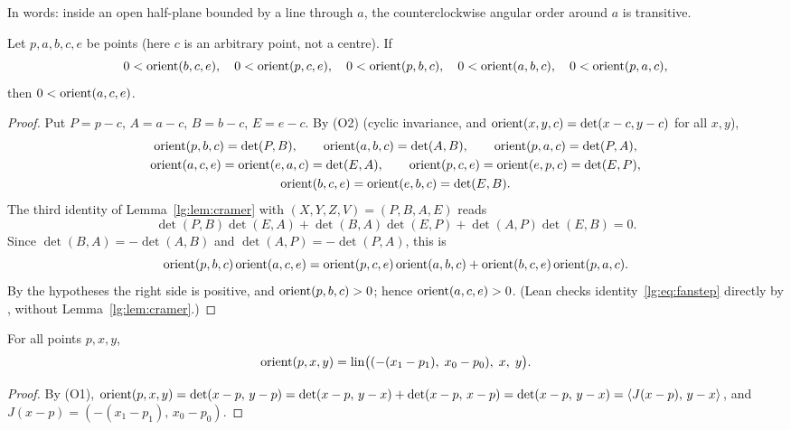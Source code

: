 In words: inside an open half-plane bounded by a line through $a$, the counterclockwise angular order around $a$ is
transitive.

\begin{lemma}\label{lg:lem:fan-step}
Let $p,a,b,c,e$ be points (here $c$ is an arbitrary point, not a centre). If
\[
  0<\operatorname{orient}(b,c,e),\quad 0<\operatorname{orient}(p,c,e),\quad 0<\operatorname{orient}(p,b,c),\quad 0<\operatorname{orient}(a,b,c),\quad 0<\operatorname{orient}(p,a,c),
\]
then $0<\operatorname{orient}(a,c,e)$.
\end{lemma}

\begin{proof}
Put $P=p-c$, $A=a-c$, $B=b-c$, $E=e-c$. By (O2) (cyclic invariance, and $\operatorname{orient}(x,y,c)=\det(x-c,y-c)$ for all
$x,y$),
\begin{gather*}
  \operatorname{orient}(p,b,c)=\det(P,B),\qquad \operatorname{orient}(a,b,c)=\det(A,B),\qquad \operatorname{orient}(p,a,c)=\det(P,A),\\
  \operatorname{orient}(a,c,e)=\operatorname{orient}(e,a,c)=\det(E,A),\qquad \operatorname{orient}(p,c,e)=\operatorname{orient}(e,p,c)=\det(E,P),\\
  \operatorname{orient}(b,c,e)=\operatorname{orient}(e,b,c)=\det(E,B).
\end{gather*}
The third identity of Lemma~\ref{lg:lem:cramer} with $(X,Y,Z,V)=(P,B,A,E)$ reads
\[
  \det(P,B)\det(E,A)+\det(B,A)\det(E,P)+\det(A,P)\det(E,B)=0.
\]
Since $\det(B,A)=-\det(A,B)$ and $\det(A,P)=-\det(P,A)$, this is
\begin{equation}\label{lg:eq:fanstep}
  \operatorname{orient}(p,b,c)\operatorname{orient}(a,c,e)=\operatorname{orient}(p,c,e)\operatorname{orient}(a,b,c)+\operatorname{orient}(b,c,e)\operatorname{orient}(p,a,c).
\end{equation}
By the hypotheses the right side is positive, and $\operatorname{orient}(p,b,c)>0$; hence $\operatorname{orient}(a,c,e)>0$. (Lean checks
identity~\eqref{lg:eq:fanstep} directly by , without Lemma~\ref{lg:lem:cramer}.)
\end{proof}

\begin{lemma}\label{lg:lem:orient-lin}
For all points $p,x,y$,
\[
  \operatorname{orient}(p,x,y)=\operatorname{lin}\bigl((-(x_1-p_1),\;x_0-p_0),\;x,\;y\bigr).
\]
\end{lemma}

\begin{proof}
By (O1), $\operatorname{orient}(p,x,y)=\det(x-p,\,y-p)=\det(x-p,\,y-x)+\det(x-p,\,x-p)=\det(x-p,\,y-x)=\langle J(x-p),\,y-x\rangle$,
and $J(x-p)=(-(x_1-p_1),\,x_0-p_0)$.
\end{proof}


